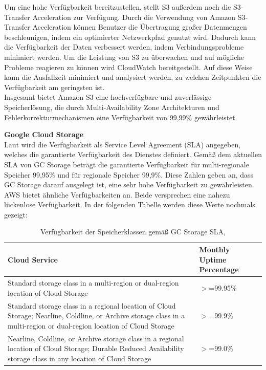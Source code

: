 Um eine hohe Verfügbarkeit bereitzustellen, stellt S3 außerdem noch die S3-Transfer Acceleration zur Verfügung. Durch die Verwendung von Amazon S3-Transfer Acceleration können Benutzer die Übertragung großer Datenmengen beschleunigen, indem ein optimierter Netzwerkpfad genutzt wird. Dadurch kann die Verfügbarkeit der Daten verbessert werden, indem Verbindungsprobleme minimiert werden. Um die Leistung von S3 zu überwachen und auf mögliche Probleme reagieren zu können wird CloudWatch bereitgestellt. Auf diese Weise kann die Ausfallzeit minimiert und analysiert werden, zu welchen Zeitpunkten die Verfügbarkeit am geringsten ist.\\

Insgesamt bietet Amazon S3 eine hochverfügbare und zuverlässige Speicherlösung, die durch Multi-Availability Zone Architekturen und Fehlerkorrekturmechanismen eine Verfügbarkeit von 99,99\% gewährleistet.

\newpage

\textbf{Google Cloud Storage}\\

Laut \cite{gcp-sla} wird die Verfügbarkeit als Service Level Agreement (SLA) angegeben, welches die garantierte Verfügbarkeit des Dienstes definiert. Gemäß dem aktuellen SLA von GC Storage beträgt die garantierte Verfügbarkeit für multi-regionale Speicher 99,95\% und für regionale Speicher 99,9\%. Diese Zahlen geben an, dass GC Storage darauf ausgelegt ist, eine sehr hohe Verfügbarkeit zu gewährleisten. AWS bietet ähnliche Verfügbarkeiten an. Beide versprechen eine nahezu lückenlose Verfügbarkeit. In der folgenden Tabelle werden diese Werte nochmals gezeigt:

\begin{table}[!h]
\centering
\begin{tabular}{ |p{5cm}|p{5cm}| }
\hline
Cloud Service & Monthly Uptime Percentage \\
\hline
\cline{1-2}
Standard storage class in a multi-region or dual-region location of Cloud Storage & $>$=99.95\% \\
\cline{1-2}
Standard storage class in a regional location of Cloud Storage; Nearline, Coldline, or Archive storage class in a multi-region or dual-region location of Cloud Storage & $>$=99.9\% \\
\cline{1-2}
Nearline, Coldline, or Archive storage class in a regional location of Cloud Storage; Durable Reduced Availability storage class in any location of Cloud Storage & $>$=99.0\% \\
\cline{1-2}
\end{tabular}
\caption{Verfügbarkeit der Speicherklassen gemäß GC Storage SLA, }
\end{table}

